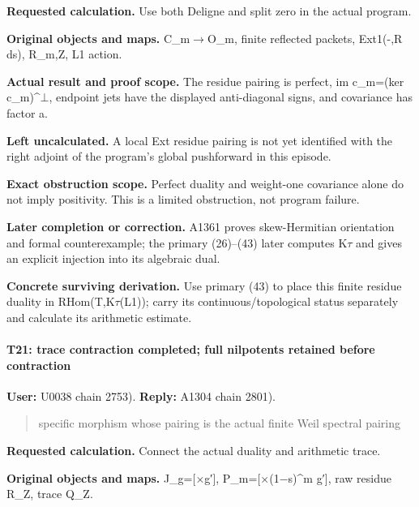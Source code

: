 \textbf{Requested calculation.} Use both Deligne and split zero in the
actual program.

\textbf{Original objects and maps.}
C\_m\allowbreak{}\ensuremath{→}\allowbreak{}O\_m, finite reflected
packets, Ext1(-,R ds), R\_m,Z, L1 action.

\textbf{Actual result and proof scope.} The residue pairing is perfect,
im c\_m=(ker
c\_m)\textasciicircum{}\allowbreak{}\ensuremath{⊥}\allowbreak{},
endpoint jets have the displayed anti-diagonal signs, and covariance has
factor a.

\textbf{Left uncalculated.} A local Ext residue pairing is not yet
identified with the right adjoint of the program's global pushforward in
this episode.

\textbf{Exact obstruction scope.} Perfect duality and weight-one
covariance alone do not imply positivity. This is a limited obstruction,
not program failure.

\textbf{Later completion or correction.} A1361 proves skew-Hermitian
orientation and formal counterexample; the primary (26)--(43) later
computes K\allowbreak{}\ensuremath{τ}\allowbreak{} and gives an explicit
injection into its algebraic dual.

\textbf{Concrete surviving derivation.} Use primary (43) to place this
finite residue duality in
RHom(T,K\allowbreak{}\ensuremath{τ}\allowbreak{}(L1)); carry its
continuous/topological status separately and calculate its arithmetic
estimate.

\paragraph{T21: trace contraction completed; full nilpotents retained
before
contraction}\label{t21-trace-contraction-completed-full-nilpotents-retained-before-contraction}

\textbf{User:} U0038
\protect{} chain 2753).
\textbf{Reply:} A1304
\protect{} chain 2801).

\begin{quote}
specific morphism whose pairing is the actual finite Weil spectral
pairing
\end{quote}

\textbf{Requested calculation.} Connect the actual duality and
arithmetic trace.

\textbf{Original objects and maps.}
J\_g=[\allowbreak{}\ensuremath{×}\allowbreak{}g′],
P\_m=[\allowbreak{}\ensuremath{×}\allowbreak{}(1\allowbreak{}\ensuremath{−}\allowbreak{}s)\textasciicircum{}m
g′{]}, raw residue R\_Z, trace Q\_Z.

